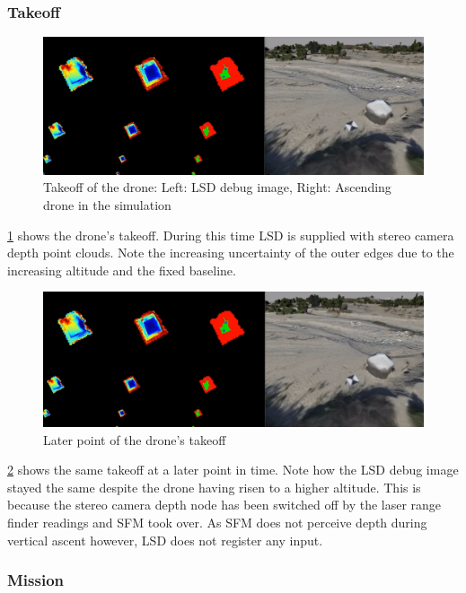 \subsubsection{Takeoff}

\begin{figure}[h]
\centering
\includegraphics[scale=0.27]{images/autonomous_landing/demo_flight/takeoff1.png}
\caption{Takeoff of the drone: Left: LSD debug image, Right: Ascending drone in the simulation}
\label{fig:demo_takeoff1}
\end{figure}

\cref{fig:demo_takeoff1} shows the drone's takeoff. During this time LSD is supplied with stereo camera depth point clouds. Note the increasing uncertainty of the outer edges due to the increasing altitude and the fixed baseline.

\begin{figure}[h]
\centering
\includegraphics[scale=0.27]{images/autonomous_landing/demo_flight/takeoff2.png}
\caption{Later point of the drone's takeoff}
\label{fig:demo_takeoff2}
\end{figure}

\cref{fig:demo_takeoff2} shows the same takeoff at a later point in time. Note how the LSD debug image stayed the same despite the drone having risen to a higher altitude. This is because the stereo camera depth node has been switched off by the laser range finder readings and SFM took over. As SFM does not perceive depth during vertical ascent however, LSD does not register any input.

\subsubsection{Mission}

